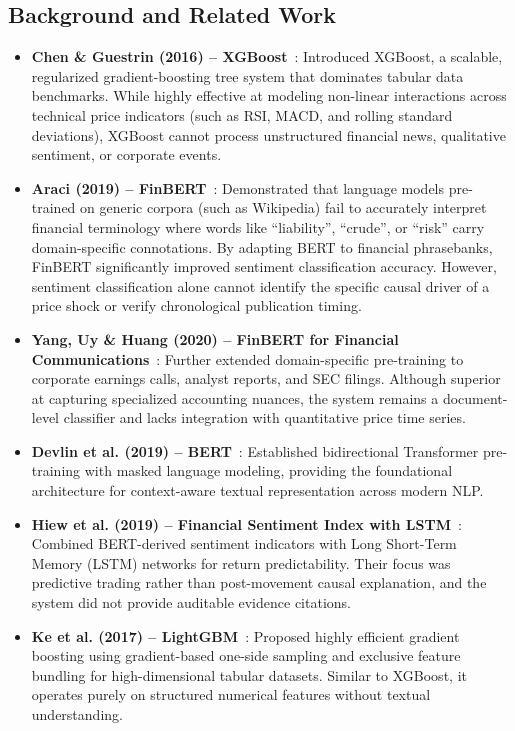 \documentclass{article}
\begin{document}
	\subsection{Background and Related Work}

	\begin{itemize}
		\item \textbf{Chen \& Guestrin (2016) -- XGBoost}~\cite{chen2016xgboost}: Introduced XGBoost, a scalable, regularized gradient-boosting tree system that dominates tabular data benchmarks. While highly effective at modeling non-linear interactions across technical price indicators (such as RSI, MACD, and rolling standard deviations), XGBoost cannot process unstructured financial news, qualitative sentiment, or corporate events.
		\item \textbf{Araci (2019) -- FinBERT}~\cite{araci2019finbert}: Demonstrated that language models pre-trained on generic corpora (such as Wikipedia) fail to accurately interpret financial terminology where words like ``liability'', ``crude'', or ``risk'' carry domain-specific connotations. By adapting BERT to financial phrasebanks, FinBERT significantly improved sentiment classification accuracy. However, sentiment classification alone cannot identify the specific causal driver of a price shock or verify chronological publication timing.
		\item \textbf{Yang, Uy \& Huang (2020) -- FinBERT for Financial Communications}~\cite{yang2020finbert}: Further extended domain-specific pre-training to corporate earnings calls, analyst reports, and SEC filings. Although superior at capturing specialized accounting nuances, the system remains a document-level classifier and lacks integration with quantitative price time series.
		\item \textbf{Devlin et al. (2019) -- BERT}~\cite{devlin2019bert}: Established bidirectional Transformer pre-training with masked language modeling, providing the foundational architecture for context-aware textual representation across modern NLP.
		\item \textbf{Hiew et al. (2019) -- Financial Sentiment Index with LSTM}~\cite{hiew2019bert}: Combined BERT-derived sentiment indicators with Long Short-Term Memory (LSTM) networks for return predictability. Their focus was predictive trading rather than post-movement causal explanation, and the system did not provide auditable evidence citations.
		\item \textbf{Ke et al. (2017) -- LightGBM}~\cite{ke2017lightgbm}: Proposed highly efficient gradient boosting using gradient-based one-side sampling and exclusive feature bundling for high-dimensional tabular datasets. Similar to XGBoost, it operates purely on structured numerical features without textual understanding.

\end{itemize}
\end{document}
